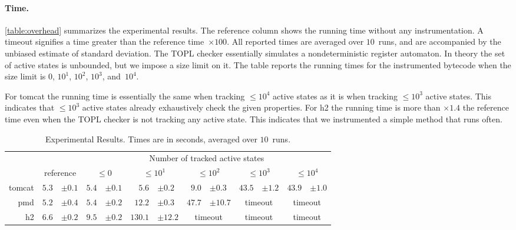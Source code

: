\documentclass[9pt, preprint]{sigplanconf} %
\theoremstyle{definition}
\theoremstyle{remark}
\begin{document}
\paragraph{Time.}
\autoref{table:overhead} summarizes the experimental results.
The reference column shows the running time without any instrumentation.
A timeout signifies a time greater than the reference time~$\times100$.
All reported times are averaged over $10$~runs, and are accompanied by the unbiased estimate of standard deviation.
The TOPL checker essentially simulates a nondeterministic register automaton.
In theory the set of active states is unbounded, but we impose a size limit on it.
The table reports the running times for the instrumented bytecode when the size limit is $0$, $10^1$, $10^2$, $10^3$, and~$10^4$.

For tomcat the running time is essentially the same when tracking $\le10^4$ active states as it is when tracking $\le10^3$ active states.
This indicates that $\le10^3$ active states already exhaustively check the given properties.
For h2 the running time is more than $\times1.4$ the reference time even when the TOPL checker is not tracking any active state.
This indicates that we instrumented a simple method that runs often.

\begin{table*}[t]\centering
\begin{tabular}{@{}rr@{}lr@{}lr@{}lr@{}lr@{}lr@{}l}
  &&
  & \multicolumn{10}{c}{Number of tracked active states} \\ \cmidrule{4-13}
& \multicolumn{2}{c}{reference}
  &\multicolumn{2}{c}{$\le0$}
  &\multicolumn{2}{c}{$\le10^1$}
  &\multicolumn{2}{c}{$\le10^2$}
  &\multicolumn{2}{c}{$\le10^3$}
  &\multicolumn{2}{c}{$\le10^4$} \\ \midrule
tomcat
  & $5.3$ & $\pm0.1$
  & $5.4$ & $\pm0.1$
  & $5.6$ & $\pm0.2$
  & $9.0$ & $\pm0.3$
  & $43.5$ & $\pm1.2$
  & $43.9$ & $\pm1.0$ \\
pmd
  & $5.2$ & $\pm0.4$
  & $5.4$ & $\pm0.2$
  & $12.2$ & $\pm0.3$
  & $47.7$ & $\pm10.7$
  & \multicolumn{2}{c}{timeout}
  & \multicolumn{2}{c}{timeout}
  \\
h2
  & $6.6$ & $\pm0.2$
  & $9.5$ & $\pm0.2$
  & $130.1$ & $\pm12.2$
  & \multicolumn{2}{c}{timeout}
  & \multicolumn{2}{c}{timeout}
  & \multicolumn{2}{c}{timeout}
  \\
\end{tabular}
\caption{
  Experimental Results.
  Times are in seconds, averaged over $10$~runs.
}\label{table:overhead}
\end{table*}
\end{document}

